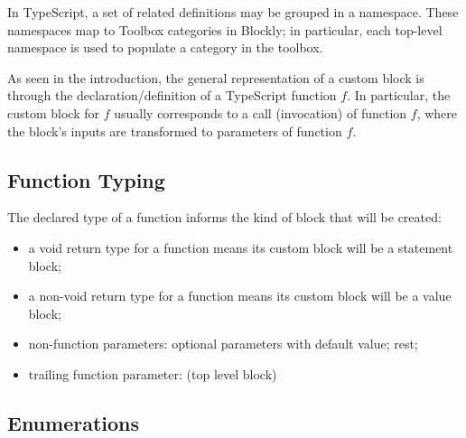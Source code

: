 In TypeScript, a set of related definitions may be grouped in a namespace.
These namespaces map to Toolbox categories in Blockly;
in particular, each top-level namespace is used to populate a category 
in the toolbox. 

As seen in the introduction, 
the general representation of a custom block is through the declaration/definition
of a TypeScript function $f$.  In particular, the custom block for $f$ usually
corresponds to a call (invocation) of function $f$, where the block's inputs
are transformed to parameters of function $f$.

\subsection{Function Typing}

The declared type of a function informs the kind of block that will be created:
\begin{itemize}
  \item a void return type for a function means its custom block will be a statement block;
  \item a non-void return type for a function means its custom block will be a value block;
  \item non-function parameters: optional parameters with default value; rest; 
  \item trailing function parameter: (top level block)
\end{itemize}





\subsection{Enumerations}

